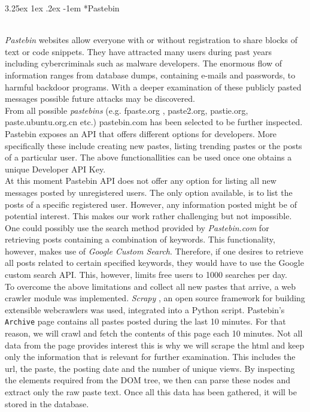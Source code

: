 \documentclass[12pt]{article}
\makeatletter
\renewcommand\paragraph{\@startsection{paragraph}{5}{\z@}%
  {3.25ex \@plus1ex \@minus.2ex}%
  {-1em}%
  {\normalfont\normalsize\bfseries}}
\makeatother
\begin{document}
\newpage
\paragraph*{Pastebin}
\hfill \break
\\
\textit{Pastebin} websites \cite{fpaste} \cite{pastebin} allow everyone with or without registration to share blocks of text or code snippets. They have attracted many users during past years including cybercriminals such as malware developers\cite{pastebin-magazine}. The enormous flow of information ranges from database dumps, containing e-mails and passwords, to harmful backdoor programs. With a deeper examination of these publicly pasted messages possible future attacks may be discovered.\\
\hfill \break
From all possible \textit{pastebins} (e.g. fpaste.org \cite{fpaste}, paste2.org, pastie.org\cite{pastebin-pastie}, 
paste.ubuntu.org.cn \cite{pastebin-ubuntu} etc.) pastebin.com \cite{pastebin} has been selected to be further inspected.
\hfill \break
\\
Pastebin exposes an API that offers different options for developers. More specifically these include creating new pastes, listing trending pastes or the posts of a particular user. The above functionallities can be used once one obtains a unique Developer API Key. 
\hfill \break
\\
At this moment Pastebin API \cite{pastebin} does not offer any option for listing all new messages posted by unregistered users. The only option available, is to list the posts of a specific registered user. However, any information posted might be of potential interest. 
This makes our work rather challenging but not impossible.  
\hfill \break
\\
One could possibly use the search method provided by \textit{Pastebin.com} for retrieving posts containing a combination of keywords.
This functionality, however, makes use of \textit{Google Custom Search}. Therefore, if one desires to retrieve all posts related to certain specified keywords, they would have to use the Google custom search API. This, however, limits free users to 1000 searches per day. 
\hfill \break
\\
To overcome the above limitations and collect all new pastes that arrive, a web crawler module was implemented. \textit{Scrapy} \cite{scrapy}, an open source framework for building extensible webcrawlers was used, integrated into a Python script. Pastebin's \texttt{Archive} page contains all pastes posted during the last 10 minutes. For that reason, we will crawl and fetch the contents of this page each 10 minutes. Not all data from the page provides interest this is why we will scrape the html and keep only the information that is relevant for further examination. This includes the url, the paste, the posting date and the number of unique views. By inspecting the elements required from the DOM tree, we then can parse these nodes and extract only the raw paste text. Once all this data has been gathered, it will be stored in the database.
\end{document}
